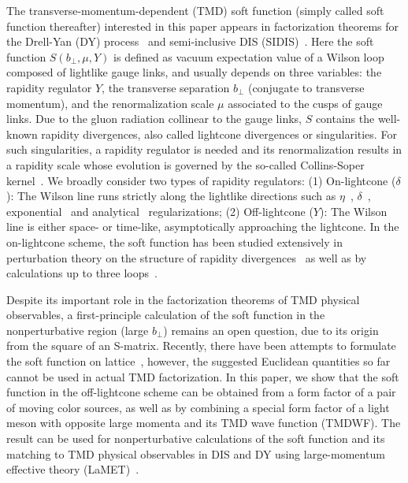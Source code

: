 \documentclass[twocolumn,aps,preprintnumbers,prd,superscriptaddress,10pt]{revtex4-1}
\begin{document}
The transverse-momentum-dependent (TMD) soft function (simply called soft function thereafter) interested in this paper appears in factorization theorems for the Drell-Yan (DY) process~\cite{Collins:1984kg,Collins:1988ig} and semi-inclusive DIS (SIDIS)~\cite{Ji:2004wu,Ji:2004xq}.
%
Here the soft function $S(b_\perp,\mu,Y)$ is defined as vacuum expectation value of a Wilson loop composed of
lightlike gauge links, and usually depends on three variables: the rapidity regulator $Y$, the transverse separation $b_\perp$ (conjugate to transverse momentum), and the renormalization scale $\mu$ associated to the cusps of gauge links.
%
Due to the gluon radiation collinear to the gauge links,
%
$S$ contains the well-known rapidity divergences, also called lightcone divergences or singularities.
For such singularities, a rapidity regulator is needed and its renormalization results in a rapidity scale
whose evolution is governed by the so-called Collins-Soper kernel~\cite{Collins:1981uk}.
We broadly consider two types of rapidity regulators:
(1) On-lightcone ($\delta$): The Wilson line runs strictly along the lightlike directions such as $\eta$~\cite{Chiu:2012ir}, $\delta$~\cite{Echevarria:2015byo}, exponential~\cite{Li:2016ctv} and analytical~\cite{Becher:2010tm} regularizations; (2) Off-lightcone ($Y$): The Wilson line is either
space- or time-like, asymptotically approaching the lightcone.
%
In the on-lightcone scheme, the soft function has been studied extensively in perturbation theory on the structure of rapidity divergences~\cite{Vladimirov:2017ksc} as well as by calculations up to three loops~\cite{Echevarria:2015byo,Luebbert:2016itl,Li:2016axz,Li:2016ctv,Luo:2019hmp}.

Despite its important role in the factorization theorems of TMD physical observables, a first-principle calculation of the soft function in the nonperturbative region (large $b_\perp$) remains an open question, due to its origin from the square of an S-matrix.
Recently, there have been attempts to formulate the soft function on lattice~\cite{Ji:2014hxa,Ji:2018hvs,Ebert:2019okf}, however,
the suggested Euclidean quantities so far cannot be used in actual TMD factorization.
%
In this paper, we show that the soft function in the off-lightcone scheme
can be obtained from a form factor of a pair of moving color sources, as well as by combining
a special form factor of a light meson with opposite large momenta and its TMD wave function (TMDWF). The result
can be used for nonperturbative calculations of the soft function and its
matching to TMD physical observables in DIS and DY using large-momentum effective theory (LaMET)~\cite{Ji:2013dva,Ji:2014gla}.
\end{document}
